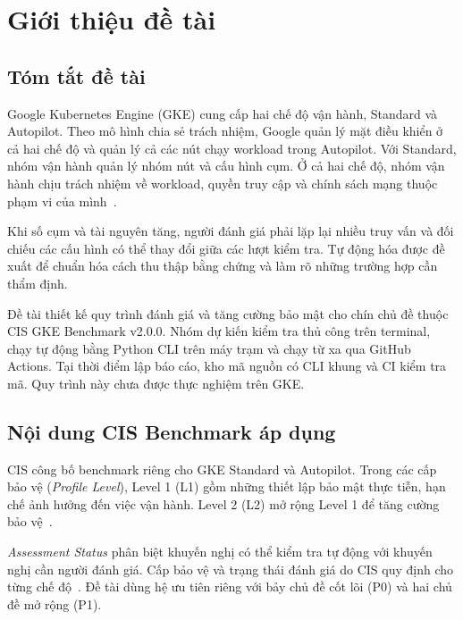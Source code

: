 \chapter{Giới thiệu đề tài}
\label{chap:introduction}

\section{Tóm tắt đề tài}
\label{sec:summary}

Google Kubernetes Engine (GKE) cung cấp hai chế độ vận hành, Standard và Autopilot. Theo mô hình chia sẻ trách nhiệm, Google quản lý mặt điều khiển ở cả hai chế độ và quản lý cả các nút chạy workload trong Autopilot. Với Standard, nhóm vận hành quản lý nhóm nút và cấu hình cụm. Ở cả hai chế độ, nhóm vận hành chịu trách nhiệm về workload, quyền truy cập và chính sách mạng thuộc phạm vi của mình~\mbox{\parencite{gke-shared-responsibility}}.

Khi số cụm và tài nguyên tăng, người đánh giá phải lặp lại nhiều truy vấn và đối chiếu các cấu hình có thể thay đổi giữa các lượt kiểm tra. Tự động hóa được đề xuất để chuẩn hóa cách thu thập bằng chứng và làm rõ những trường hợp cần thẩm định.

Đề tài thiết kế quy trình đánh giá và tăng cường bảo mật cho chín chủ đề thuộc CIS GKE Benchmark v2.0.0. Nhóm dự kiến kiểm tra thủ công trên terminal, chạy tự động bằng Python CLI trên máy trạm và chạy từ xa qua GitHub Actions. Tại thời điểm lập báo cáo, kho mã nguồn có CLI khung và CI kiểm tra mã. Quy trình này chưa được thực nghiệm trên GKE.

\section{Nội dung CIS Benchmark áp dụng}
\label{sec:cis-overview}

CIS công bố benchmark riêng cho GKE Standard và Autopilot. Trong các cấp bảo vệ (\emph{Profile Level}), Level 1 (L1) gồm những thiết lập bảo mật thực tiễn, hạn chế ảnh hưởng đến việc vận hành. Level 2 (L2) mở rộng Level 1 để tăng cường bảo vệ~\mbox{\parencites[tr.~13]{cis-gke-standard-v2}[tr.~13]{cis-gke-autopilot-v2}}.

\emph{Assessment Status} phân biệt khuyến nghị có thể kiểm tra tự động với khuyến nghị cần người đánh giá. Cấp bảo vệ và trạng thái đánh giá do CIS quy định cho từng chế độ~\mbox{\parencites[tr.~11--13]{cis-gke-standard-v2}[tr.~10--13]{cis-gke-autopilot-v2}}. Đề tài dùng hệ ưu tiên riêng với bảy chủ đề cốt lõi (P0) và hai chủ đề mở rộng (P1).

